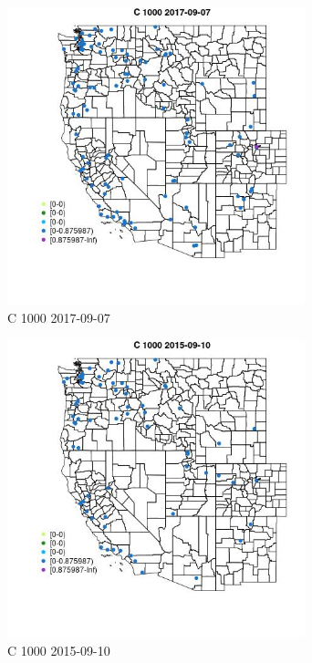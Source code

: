 \begin{figure} 
\centering  
\includegraphics[width=0.77\textwidth]{Code_Outputs/Report_ML_input_PM25_Step4_part_e_de_duplicated_aveswNAs_MapObsC_10002017-09-07.jpg} 
\caption{\label{fig:Report_ML_input_PM25_Step4_part_e_de_duplicated_aveswNAsMapObsC_10002017-09-07}C 1000 2017-09-07} 
\end{figure} 
 

\begin{figure} 
\centering  
\includegraphics[width=0.77\textwidth]{Code_Outputs/Report_ML_input_PM25_Step4_part_e_de_duplicated_aveswNAs_MapObsC_10002015-09-10.jpg} 
\caption{\label{fig:Report_ML_input_PM25_Step4_part_e_de_duplicated_aveswNAsMapObsC_10002015-09-10}C 1000 2015-09-10} 
\end{figure} 
 

